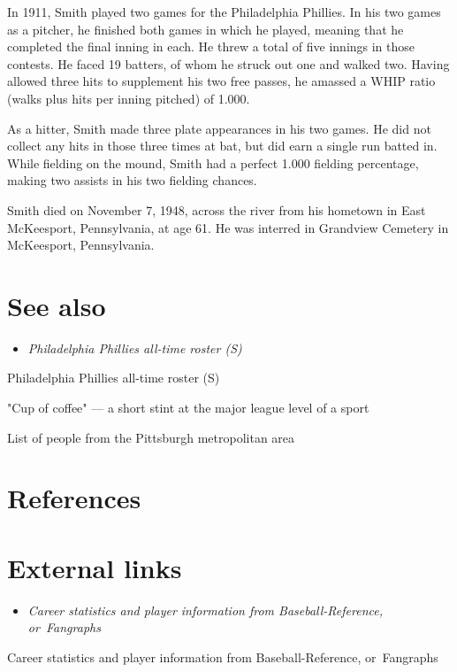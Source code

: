 In 1911, Smith played two games for the Philadelphia Phillies. In his
two games as a pitcher, he finished both games in which he played,
meaning that he completed the final inning in each. He threw a total of
five innings in those contests. He faced 19 batters, of whom he struck
out one and walked two. Having allowed three hits to supplement his two
free passes, he amassed a WHIP ratio (walks plus hits per inning
pitched) of 1.000.

As a hitter, Smith made three plate appearances in his two games. He did
not collect any hits in those three times at bat, but did earn a single
run batted in. While fielding on the mound, Smith had a perfect 1.000
fielding percentage, making two assists in his two fielding chances.

Smith died on November 7, 1948, across the river from his hometown in
East McKeesport, Pennsylvania, at age 61. He was interred in Grandview
Cemetery in McKeesport, Pennsylvania.

\section{See also}\label{see-also}

\begin{itemize}
\item
  \emph{Philadelphia Phillies all-time roster (S)}
\end{itemize}

Philadelphia Phillies all-time roster (S)

"Cup of coffee" --- a short stint at the major league level of a sport

List of people from the Pittsburgh metropolitan area

\section{References}\label{references}

\section{External links}\label{external-links}

\begin{itemize}
\item
  \emph{Career statistics and player information from
  Baseball-Reference, or~Fangraphs}
\end{itemize}

Career statistics and player information from Baseball-Reference,
or~Fangraphs
